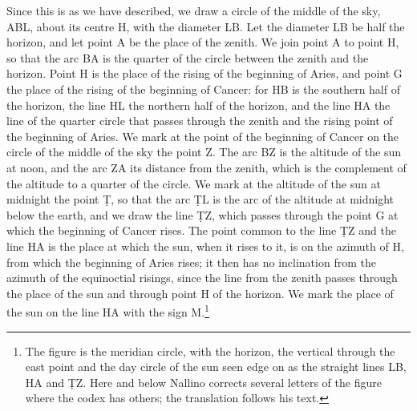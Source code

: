 \documentclass[11pt]{article}
\begin{document}
\par Since this is as we have described, we draw a circle of the middle of the sky, ABL, about its centre H, with the diameter LB. Let the diameter LB be half the horizon, and let point A be the place of the zenith. We join point A to point H, so that the arc BA is the quarter of the circle between the zenith and the horizon. Point H is the place of the rising of the beginning of Aries, and point G the place of the rising of the beginning of Cancer: for HB is the southern half of the horizon, the line HL the northern half of the horizon, and the line HA the line of the quarter circle that passes through the zenith and the rising point of the beginning of Aries. We mark at the point of the beginning of Cancer on the circle of the middle of the sky the point Z. The arc BZ is the altitude of the sun at noon, and the arc ZA its distance from the zenith, which is the complement of the altitude to a quarter of the circle. We mark at the altitude of the sun at midnight the point Ṭ, so that the arc ṬL is the arc of the altitude at midnight below the earth, and we draw the line ṬZ, which passes through the point G at which the beginning of Cancer rises. The point common to the line ṬZ and the line HA is the place at which the sun, when it rises to it, is on the azimuth of H, from which the beginning of Aries rises; it then has no inclination from the azimuth of the equinoctial risings, since the line from the zenith passes through the place of the sun and through point H of the horizon. We mark the place of the sun on the line HA with the sign M.\footnote{The figure is the meridian circle, with the horizon, the vertical through the east point and the day circle of the sun seen edge on as the straight lines LB, HA and ṬZ. Here and below Nallino corrects several letters of the figure where the codex has others; the translation follows his text.}\par
\end{document}
